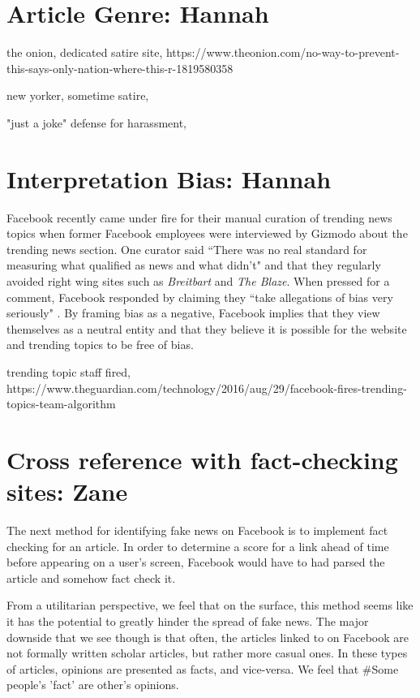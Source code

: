 \documentclass[12pt]{article}
\begin{document}
\section{Article Genre: Hannah}

the onion, dedicated satire site, https://www.theonion.com/no-way-to-prevent-this-says-only-nation-where-this-r-1819580358

new yorker, sometime satire, 

"just a joke" defense for harassment, 



\section{Interpretation Bias: Hannah}
Facebook recently came under fire for their manual curation of trending news topics when former Facebook employees were interviewed by Gizmodo about the trending news section. One curator said ``There was no real standard for measuring what qualified as news and what didn't" and that they regularly avoided right wing sites such as \textit{Breitbart} and \textit{The Blaze}. When pressed for a comment, Facebook responded by claiming they ``take allegations of bias very seriously" \citep{gizmodo_fb_news_curation}. By framing bias as a negative, Facebook implies that they view themselves as a neutral entity and that they believe it is possible for the website and trending topics to be free of bias.


trending topic staff fired, https://www.theguardian.com/technology/2016/aug/29/facebook-fires-trending-topics-team-algorithm



\section{Cross reference with fact-checking sites: Zane}
The next method for identifying fake news on Facebook is to implement fact checking for an article. In order to determine a score for a link ahead of time before appearing on a user's screen, Facebook would have to had parsed the article and somehow fact check it.

From a utilitarian perspective, we feel that on the surface, this method seems like it has the potential to greatly hinder the spread of fake news. The major downside that we see though is that often, the articles linked to on Facebook are not formally written scholar articles, but rather more casual ones. In these types of articles, opinions are presented as facts, and vice-versa. We feel that 
#Some people's 'fact' are other's opinions.
\end{document}
